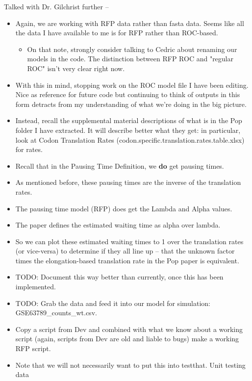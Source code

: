 \documentclass[12pt,hyperref]{labbook}
\newcommand{\sep}{\discretionary{}{}{}} %
\begin{document}
Talked with Dr. Gilchrist further --

\begin{itemize}
    \item Again, we are working with RFP data rather than fasta data. Seems like all
    the data I have available to me is for RFP rather than ROC-based.
    \begin{itemize}
        \item On that note, strongly consider talking to Cedric about renaming our models in
        the code. The distinction between RFP ROC and "regular ROC" isn't very clear right now.
    \end{itemize}
    \item With this in mind, stopping work on the ROC model file I have been editing.
    Nice as reference for future code but continuing to think of outputs in this form
    detracts from my understanding of what we're doing in the big picture.
    \item Instead, recall the supplemental material descriptions of what is in the Pop folder
    I have extracted. It will describe better what they get: in particular, look at Codon
    Translation Rates (codon.specific.translation.rates.table.xlsx) for rates.
    \item Recall that in the Pausing Time Definition, we \textbf{do} get pausing times.
    \item As mentioned before, these pausing times are the inverse of the translation rates.
    \item The pausing time model (RFP) does get the Lambda and Alpha values.
    \item The paper defines the estimated waiting time as alpha over lambda.
    \item So we can plot these estimated waiting times to 1 over the translation rates
    (or vice-versa) to determine if they all line up -- that the unknown factor times the
    elongation-based translation rate in the Pop paper is equivalent.
    \item TODO: Document this way better than currently, once this has been implemented.
    \item TODO: Grab the data and feed it into our model for simulation: GSE63789\sep \_\sep counts\sep \_\sep wt\sep .\sep csv.
    \item Copy a script from Dev and combined with what we know about a working script
    (again, scripts from Dev are old and liable to bugs) make a working RFP script.
    \item Note that we will not necessarily want to put this into testthat. Unit testing data

\end{itemize}
\end{document}
